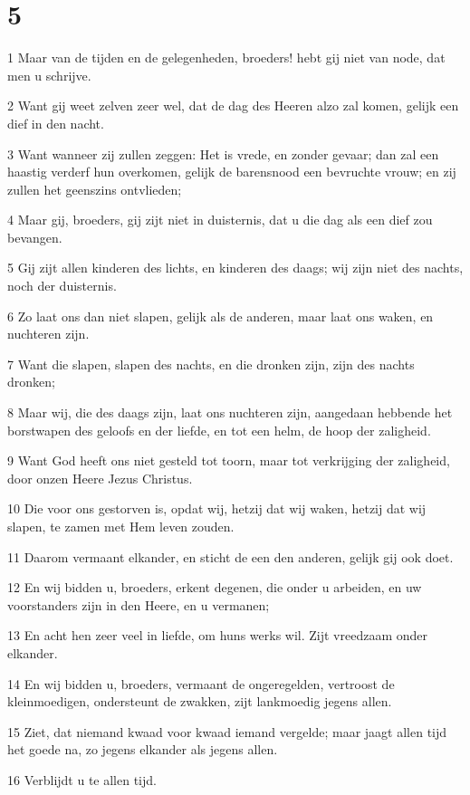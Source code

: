 \chapter{5}

\par 1 Maar van de tijden en de gelegenheden, broeders! hebt gij niet van node, dat men u schrijve.
\par 2 Want gij weet zelven zeer wel, dat de dag des Heeren alzo zal komen, gelijk een dief in den nacht.
\par 3 Want wanneer zij zullen zeggen: Het is vrede, en zonder gevaar; dan zal een haastig verderf hun overkomen, gelijk de barensnood een bevruchte vrouw; en zij zullen het geenszins ontvlieden;
\par 4 Maar gij, broeders, gij zijt niet in duisternis, dat u die dag als een dief zou bevangen.
\par 5 Gij zijt allen kinderen des lichts, en kinderen des daags; wij zijn niet des nachts, noch der duisternis.
\par 6 Zo laat ons dan niet slapen, gelijk als de anderen, maar laat ons waken, en nuchteren zijn.
\par 7 Want die slapen, slapen des nachts, en die dronken zijn, zijn des nachts dronken;
\par 8 Maar wij, die des daags zijn, laat ons nuchteren zijn, aangedaan hebbende het borstwapen des geloofs en der liefde, en tot een helm, de hoop der zaligheid.
\par 9 Want God heeft ons niet gesteld tot toorn, maar tot verkrijging der zaligheid, door onzen Heere Jezus Christus.
\par 10 Die voor ons gestorven is, opdat wij, hetzij dat wij waken, hetzij dat wij slapen, te zamen met Hem leven zouden.
\par 11 Daarom vermaant elkander, en sticht de een den anderen, gelijk gij ook doet.
\par 12 En wij bidden u, broeders, erkent degenen, die onder u arbeiden, en uw voorstanders zijn in den Heere, en u vermanen;
\par 13 En acht hen zeer veel in liefde, om huns werks wil. Zijt vreedzaam onder elkander.
\par 14 En wij bidden u, broeders, vermaant de ongeregelden, vertroost de kleinmoedigen, ondersteunt de zwakken, zijt lankmoedig jegens allen.
\par 15 Ziet, dat niemand kwaad voor kwaad iemand vergelde; maar jaagt allen tijd het goede na, zo jegens elkander als jegens allen.
\par 16 Verblijdt u te allen tijd.
